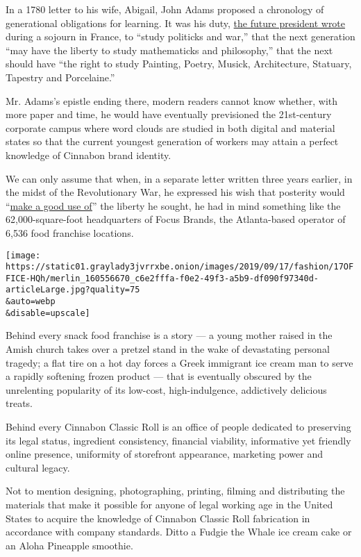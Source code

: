 In a 1780 letter to his wife, Abigail, John Adams proposed a chronology
of generational obligations for learning. It was his duty,
\href{https://www.masshist.org/digitaladams/archive/doc?id=L17800512jasecond}{the
future president wrote} during a sojourn in France, to ``study politicks
and war,'' that the next generation ``may have the liberty to study
mathematicks and philosophy,'' that the next should have ``the right to
study Painting, Poetry, Musick, Architecture, Statuary, Tapestry and
Porcelaine.''

Mr. Adams's epistle ending there, modern readers cannot know whether,
with more paper and time, he would have eventually previsioned the
21st-century corporate campus where word clouds are studied in both
digital and material states so that the current youngest generation of
workers may attain a perfect knowledge of Cinnabon brand identity.

We can only assume that when, in a separate letter written three years
earlier, in the midst of the Revolutionary War, he expressed his wish
that posterity would
``\href{https://www.masshist.org/digitaladams/archive/doc?id=L17770426ja}{make
a good use of}'' the liberty he sought, he had in mind something like
the 62,000-square-foot headquarters of Focus Brands, the Atlanta-based
operator of 6,536 food franchise locations.

\texttt{[image: https://static01.graylady3jvrrxbe.onion/images/2019/09/17/fashion/17OFFICE-HQh/merlin\_160556670\_c6e2fffa-f0e2-49f3-a5b9-df090f97340d-articleLarge.jpg?quality=75\\\&auto=webp\\\&disable=upscale]}

Behind every snack food franchise is a story --- a young mother raised
in the Amish church takes over a pretzel stand in the wake of
devastating personal tragedy; a flat tire on a hot day forces a Greek
immigrant ice cream man to serve a rapidly softening frozen product ---
that is eventually obscured by the unrelenting popularity of its
low-cost, high-indulgence, addictively delicious treats.

Behind every Cinnabon Classic Roll is an office of people dedicated to
preserving its legal status, ingredient consistency, financial
viability, informative yet friendly online presence, uniformity of
storefront appearance, marketing power and cultural legacy.

Not to mention designing, photographing, printing, filming and
distributing the materials that make it possible for anyone of legal
working age in the United States to acquire the knowledge of Cinnabon
Classic Roll fabrication in accordance with company standards. Ditto a
Fudgie the Whale ice cream cake or an Aloha Pineapple smoothie.


